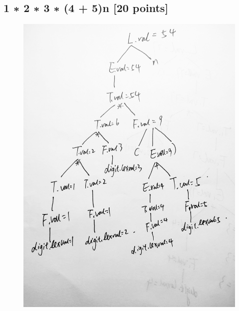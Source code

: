 \documentclass{article}
\begin{document}
        \subsection{1 ∗ 2 ∗ 3 ∗ (4 + 5)n [20 points]}
        \begin{figure}[H]
            \centering
            \includegraphics[scale=0.15]{./Q1_2.jpg}
            \label{fig:label}
        \end{figure}
\end{document}

